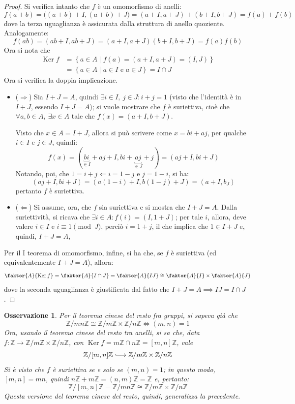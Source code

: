 \documentclass[11pt]{article}
\theoremstyle{style}
\newtheorem{osservazione}{Osservazione}[section]
\numberwithin{equation}{subsection}
\newcommand{\longhookrightarrow}{\lhook\joinrel\longrightarrow}
\begin{document}
	\begin{proof}
		Si verifica intanto che $f$ \`e un omomorfismo di anelli:
		\[
		f(a+b) = \big((a+b) +I, (a+b) + J\big) = (a+I,a+J) + (b+I,b+J) = f(a)+f(b)
		\] 
		dove la terza uguaglianza \`e assicurata dalla struttura di anello quoziente. 
		Analogamente:
		\[
		f(ab) = (ab + I, ab+ J)  = (a+I,a+J)(b+I,b+J) = f(a)f(b)
		\] 
	Ora si nota che 
	\[
		\begin{split}
			\operatorname{Ker} f&=\left\{ a \in A  \mid f(a) = (a+I,a+J) = (I,J) \right\} \\
					    &=\left\{ a \in A  \mid a \in I\text{ e } a \in J \right\} = I\cap J
		\end{split}
	\] 
	Ora si verifica la doppia implicazione.
	\begin{itemize}
		\item ($\Rightarrow $) Sia $I+J = A$, quindi $\exists i\in I, \ j \in J : i+j = 1$ (visto che l'identit\`a \`e in $I+J$, essendo $I+J=A$); si vuole mostrare che $f$ \`e suriettiva, cio\`e che $\forall a,b \in A, \ \exists x \in A $ tale che $f(x) = (a+I,b+J)$.

			Visto che $x \in A= I+J$, allora si pu\`o scrivere come $x = bi + aj$, per qualche $i \in I$ e $j\in J$, quindi:
			\[
				f(x) = (\underbracket{bi}_{\in I}  + aj + I, bi+ \underbracket{aj}_{\in J}  + j) = (aj+I,bi+J)
			\] 
			Notando, poi, che $1 = i + j\Leftarrow i= 1-j$ e $j=1-i$, si ha:
			\[
				(aj +I , bi+J) = (a(1-i) + I, b(1-j) + J) = (a+I,b_J)
			\] 
			pertanto $f$ \`e suriettiva.
		\item ($\Leftarrow $) Si assume, ora, che $f$ sia suriettiva e si mostra che $I+J = A$.
			Dalla suriettivit\`a, si ricava che $\exists i \in A : f(i) = (I,1+J)$; per tale $i$, allora, deve valere $i \in I$ e $i\equiv 1 \pmod{J} $, perci\`o $i = 1+j$, il che implica che $1 \in I+J$ e, quindi, $I+J=A$,
	\end{itemize}
	Per il I teorema di omomorfismo, infine, si ha che, se $f$ \`e suriettiva (ed equivalentemente $I+J = A$), allora:
	\[
		\faktor{A}{\operatorname{Ker} f}=\faktor{A}{I\cap J}=\faktor{A}{I J}\cong \faktor{A}{I} \times \faktor{A}{J}
	\] 
	dove la seconda uguaglianza \`e giustificata dal fatto che $I+J = A \implies IJ = I\cap J$.
	\end{proof}
\begin{osservazione}
Per il teorema cinese del resto fra gruppi, si sapeva gi\`a che 
\[
\mathbb{Z}/mn\mathbb{Z} \cong \mathbb{Z} / m\mathbb{Z}\times \mathbb{Z}/n\mathbb{Z} \iff (m,n) = 1
\] 
Ora, usando il teorema cinese del resto tra anelli, si sa che, data $f:\mathbb{Z}\longrightarrow \mathbb{Z}/ m \mathbb{Z} \times  \mathbb{Z}/ n \mathbb{Z}$, con $\operatorname{Ker} f = m\mathbb{Z} \cap n \mathbb{Z} = [m,n]\mathbb{Z}$, vale
\[
	\mathbb{Z}/[m,n]\mathbb{Z}\longhookrightarrow \mathbb{Z}/ m\mathbb{Z}\times \mathbb{Z}/n\mathbb{Z}
\] 
Si \`e visto che $f$ \`e suriettiva se e solo se $(m,n) = 1$; in questo modo, $[m,n] = mn$, quindi $n\mathbb{Z}+m\mathbb{Z}= (n,m)\mathbb{Z}=\mathbb{Z}$ e, pertanto:
\[
	\mathbb{Z}/ [m,n]\mathbb{Z}= \mathbb{Z}/ mn\mathbb{Z}\cong \mathbb{Z}/ m\mathbb{Z}\times \mathbb{Z}/n\mathbb{Z}
\] 
Questa versione del teorema cinese del resto, quindi, generalizza la precedente.
\end{osservazione}
\end{document}
